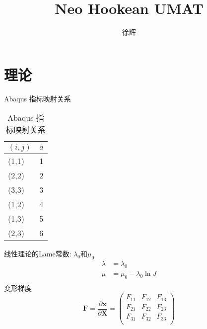 \documentclass{article}
\title{Neo Hookean UMAT}
\author{徐辉}
\begin{document}
\maketitle
\section{理论}
Abaqus 指标映射关系
\begin{table}[H]
    \centering
    \begin{tabular}{ll}
        \hline
        $(i,j)$ & $a$ \\
        \hline
        (1,1)   & 1   \\
        (2,2)   & 2   \\
        (3,3)   & 3   \\
        (1,2)   & 4   \\
        (1,3)   & 5   \\
        (2,3)   & 6   \\
        \hline
    \end{tabular}
    \caption{Abaqus 指标映射关系}
\end{table}
线性理论的Lame常数: $\lambda_0$和$\mu_0$
\begin{equation*}
    \begin{aligned}
        \lambda & = \lambda_0               \\
        \mu     & = \mu_0 - \lambda_0 \ln J \\
    \end{aligned}
\end{equation*}
变形梯度
$$\bm{F}=\frac{\partial \bm{x}}{ \partial \bm{X}}=\left(
    \begin{array}{ccc}
            F_{11} & F_{12} & F_{13} \\
            F_{21} & F_{22} & F_{23} \\
            F_{31} & F_{32} & F_{33} \\
        \end{array}
    \right)$$
\end{document}

